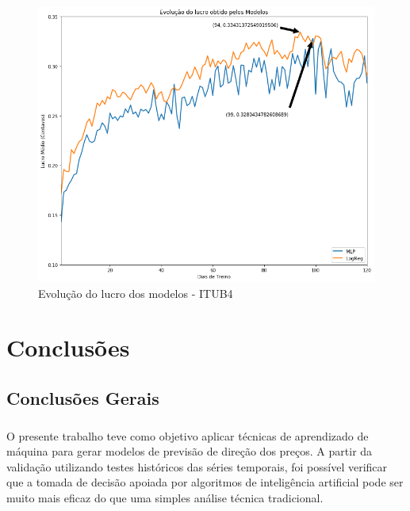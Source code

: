 \documentclass[grad,numbers]{coppe}
\begin{document}
        \begin{figure}[h!]
            \caption{Evolução do lucro dos modelos - ITUB4}
            \label{img:lucro-itub4} \includegraphics[width=13.1cm]{lucro-itub4.png}
            \centering
        \end{figure}
  
  \chapter{Conclusões}
  
    \section{Conclusões Gerais}
    
        \paragraph{}O presente trabalho teve como objetivo aplicar técnicas de aprendizado de máquina para gerar modelos de previsão de direção dos preços. A partir da validação utilizando testes históricos das séries temporais, foi possível verificar que a tomada de decisão apoiada por algoritmos de inteligência artificial pode ser muito mais eficaz do que uma simples análise técnica tradicional.
        
\end{document}
